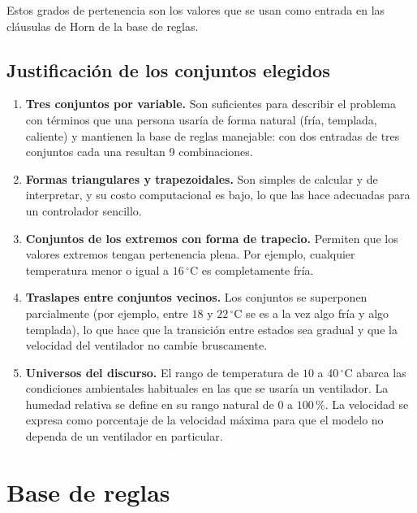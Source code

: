 \documentclass[11pt]{article}
\begin{document}
Estos grados de pertenencia son los valores que se usan como entrada en las cláusulas de Horn de la base de reglas.

\subsection{Justificación de los conjuntos elegidos}

\begin{enumerate}
  \item \textbf{Tres conjuntos por variable.} Son suficientes para describir el problema con términos que una persona usaría de forma natural (fría, templada, caliente) y mantienen la base de reglas manejable: con dos entradas de tres conjuntos cada una resultan 9 combinaciones.
  \item \textbf{Formas triangulares y trapezoidales.} Son simples de calcular y de interpretar, y su costo computacional es bajo, lo que las hace adecuadas para un controlador sencillo.
  \item \textbf{Conjuntos de los extremos con forma de trapecio.} Permiten que los valores extremos tengan pertenencia plena. Por ejemplo, cualquier temperatura menor o igual a $16\,^\circ$C es completamente fría.
  \item \textbf{Traslapes entre conjuntos vecinos.} Los conjuntos se superponen parcialmente (por ejemplo, entre $18$ y $22\,^\circ$C se es a la vez algo fría y algo templada), lo que hace que la transición entre estados sea gradual y que la velocidad del ventilador no cambie bruscamente.
  \item \textbf{Universos del discurso.} El rango de temperatura de $10$ a $40\,^\circ$C abarca las condiciones ambientales habituales en las que se usaría un ventilador. La humedad relativa se define en su rango natural de $0$ a $100\,\%$. La velocidad se expresa como porcentaje de la velocidad máxima para que el modelo no dependa de un ventilador en particular.
\end{enumerate}


\section{Base de reglas}
\label{sec:reglas}
\end{document}
